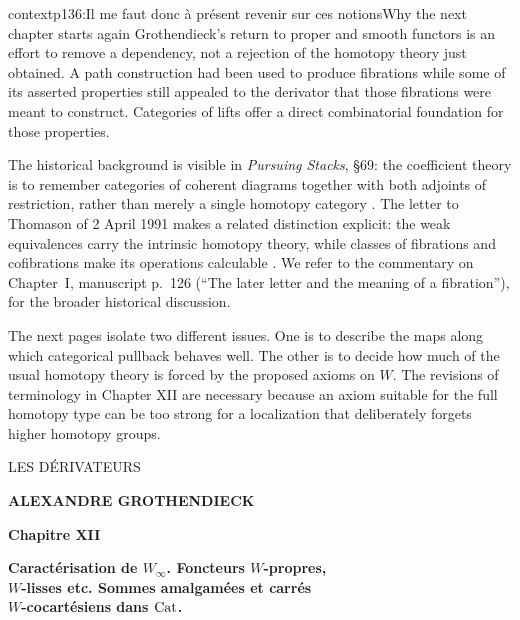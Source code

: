 \begin{dcomment}{context}{p136:Il me faut donc à présent revenir sur ces notions}{Why the next chapter starts again}
Grothendieck's return to proper and smooth functors is an effort to remove a dependency, not a rejection of the homotopy theory just obtained. A path construction had been used to produce fibrations while some of its asserted properties still appealed to the derivator that those fibrations were meant to construct. Categories of lifts offer a direct combinatorial foundation for those properties.

The historical background is visible in \emph{Pursuing Stacks}, \S69: the coefficient theory is to remember categories of coherent diagrams together with both adjoints of restriction, rather than merely a single homotopy category \citep{Grothendieck1983}. The letter to Thomason of 2 April 1991 makes a related distinction explicit: the weak equivalences carry the intrinsic homotopy theory, while classes of fibrations and cofibrations make its operations calculable \citep[\S1]{Grothendieck1991Letter}. We refer to the commentary on Chapter~I, manuscript p.~126 (“The later letter and the meaning of a fibration”), for the broader historical discussion.

The next pages isolate two different issues. One is to describe the maps along which categorical pullback behaves well. The other is to decide how much of the usual homotopy theory is forced by the proposed axioms on \(W\). The revisions of terminology in Chapter XII are necessary because an axiom suitable for the full homotopy type can be too strong for a localization that deliberately forgets higher homotopy groups.
\end{dcomment}
\printedpage{--}

\begin{center}
{\Large \textsf{LES DÉRIVATEURS}}

\bigskip

\textbf{ALEXANDRE GROTHENDIECK}

\bigskip\bigskip

\textbf{Chapitre XII}

\medskip

\textbf{Caractérisation de $W_\infty$. Foncteurs $W$-propres,\\
$W$-lisses etc. Sommes amalgamées et carrés\\
$W$-cocartésiens dans $\mathrm{Cat}$.}
\end{center}

